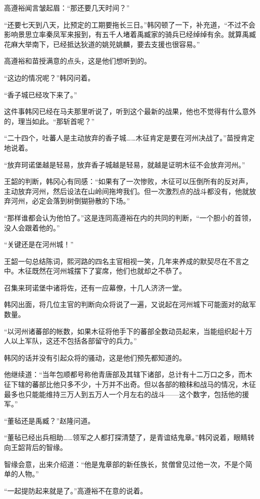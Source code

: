 高遵裕闻言皱起眉：“那还要几天时间？”

“还要七天到八天，比预定的工期要拖长三日。”韩冈顿了一下，补充道，“不过不会影响景思立率秦凤军来报到，有五千人堵着禹臧家的骑兵已经绰绰有余。就算禹臧花麻大举南下，已经抵达狄道的姚兕姚麟，要去支援也很容易。”

高遵裕和苗授满意的点头，这是他们想听到的。

“这边的情况呢？”韩冈问着。

“香子城已经攻下来了。”

这件事韩冈已经在马夫那里听说了，听到这个最新的战果，他也不觉得有什么意外的，理当如此。“那斩首呢？”

“二十四个，吐蕃人是主动放弃的香子城……木征肯定是要在河州决战了。”苗授肯定地说着。

“放弃珂诺堡越是轻易，放弃香子城越是轻易，就越是证明木征不会放弃河州。”

王韶的判断，韩冈心有同感：“如果有了一次惨败，木征可以压倒所有的反对声，主动放弃河州，然后设法在山岭间拖垮我们。但一次激烈点的战斗都没有，他就放弃河州，必定会落到树倒猢狲散的下场。”

“那样谁都会认为他怕了。”这是连同高遵裕在内的共同的判断，“一个胆小的首领，没人会跟着他的。”

“关键还是在河州城！”

王韶一句总结陈词，熙河路的四名主官相视一笑，几年来养成的默契尽在不言之中。木征既然在河州城摆下了宴席，他们也就却之不恭了。

召集来珂诺堡中诸将佐，还有一应幕僚，十几人济济一堂。

韩冈出面，将几位主官的判断向众将说了一遍，又说起在河州城下可能面对的敌军数量。

“以河州诸蕃部的帐数，如果木征将他手下的蕃部全数动员起来，当能组织起十万人以上军队，这还不包括各部留守的兵力。”

韩冈的话并没有引起众将的骚动，这是他们预先都知道的。

他继续道：“当年包顺都号称他青唐部及其辖下诸部，总计有十二万口之多，而木征下辖的蕃部比他只多不少，十万并不出奇。但以各部的粮秣和战马的情况，木征最多也只能能维持三万人到五万人一个月左右的战斗——这个数字，包括他的援军。”

“董毡还是禹臧？”赵隆问道。

“董毡已经出兵相助……领军之人都打探清楚了，是青谊结鬼章。”韩冈说着，眼睛转向王韶背后的智缘。

智缘会意，出来介绍道：“他是鬼章部的新任族长，贫僧曾见过他一次，不是个简单的人物。”

“一起提防起来就是了。”高遵裕不在意的说着。

